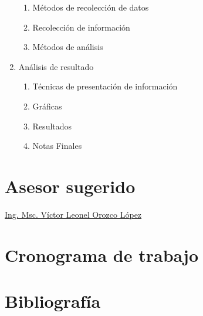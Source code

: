\documentclass[12pt]{report}
\begin{document}
\begin{enumerate}
\begin{enumerate}
  \item Métodos de recolección de datos
  \item Recolección de información
  \item Métodos de análisis  
  \end{enumerate}
\item Análisis de resultado
  \begin{enumerate}
  \item Técnicas de presentación de información
  \item Gráficas
  \item Resultados
  \item Notas Finales
  \end{enumerate}
\end{enumerate}

\chapter*{Asesor sugerido}

\href{http://vorozco.com/cv/index-es.html}{Ing. Msc. Víctor Leonel 
Orozco López}


\chapter*{Cronograma de trabajo}

\chapter*{Bibliografía}

\end{document}
